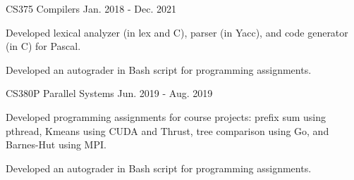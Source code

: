 
\begin{cventries}

  \cvresearchentry
    {CS375 Compilers} %
    {Jan. 2018 - Dec. 2021} %
    {
      \begin{cvitems} %
      \item Developed lexical analyzer (in lex and C), parser (in Yacc),
        and code generator (in C) for Pascal.
      \item Developed an autograder in Bash script for programming assignments.
      \end{cvitems}
    }

  \cvresearchentry
    {CS380P Parallel Systems} %
    {Jun. 2019 - Aug. 2019} %
    {
      \begin{cvitems} %
      \item Developed programming assignments for course projects: prefix sum
        using pthread, Kmeans using CUDA and Thrust, tree comparison using Go,
        and Barnes-Hut using MPI.
      \item Developed an autograder in Bash script for programming assignments.
      \end{cvitems}
    }
  
\end{cventries}